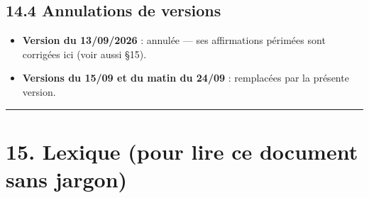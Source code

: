 \documentclass[11pt,a4paper]{article}
\begin{document}
\subsection*{14.4 Annulations de versions}
\begin{itemize}  \item \textbf{Version du 13/09/2026} : annulée — ses affirmations périmées sont corrigées ici (voir aussi §15).
\end{itemize}

\begin{itemize}  \item \textbf{Versions du 15/09 et du matin du 24/09} : remplacées par la présente version.
\end{itemize}

\medskip\hrule\medskip
\section*{15. Lexique (pour lire ce document sans jargon)}
\sloppy
\end{document}
